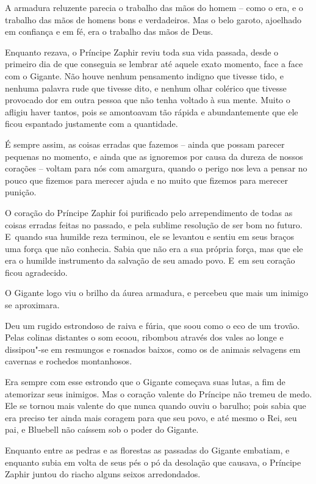 A armadura reluzente parecia o trabalho das mãos do homem -- como o era,
e o trabalho das mãos de homens bons e verdadeiros. Mas o belo garoto,
ajoelhado em confiança e em fé, era o trabalho das mãos de Deus.

Enquanto rezava, o Príncipe Zaphir reviu toda sua vida passada, desde o
primeiro dia de que conseguia se lembrar até aquele exato momento, face
a face com o Gigante. Não houve nenhum pensamento indigno que tivesse
tido, e nenhuma palavra rude que tivesse dito, e nenhum olhar colérico
que tivesse provocado dor em outra pessoa que não tenha voltado à sua
mente. Muito o afligiu haver tantos, pois se amontoavam tão rápida e
abundantemente que ele ficou espantado justamente com a quantidade.

É sempre assim, as coisas erradas que fazemos -- ainda que possam
parecer pequenas no momento, e ainda que as ignoremos por causa da
dureza de nossos corações -- voltam para nós com amargura, quando o
perigo nos leva a pensar no pouco que fizemos para merecer ajuda e no
muito que fizemos para merecer punição.

O coração do Príncipe Zaphir foi purificado pelo arrependimento de todas
as coisas erradas feitas no passado, e pela sublime resolução de ser bom
no futuro. E~quando sua humilde reza terminou, ele se levantou e sentiu
em seus braços uma força que não conhecia. Sabia que não era a sua
própria força, mas que ele era o humilde instrumento da salvação de seu
amado povo. E~em seu coração ficou agradecido.

O Gigante logo viu o brilho da áurea armadura, e percebeu que mais um
inimigo se aproximara.

Deu um rugido estrondoso de raiva e fúria, que soou como o eco de um
trovão. Pelas colinas distantes o som ecoou, ribombou através dos vales
ao longe e dissipou"-se em resmungos e rosnados baixos, como os de
animais selvagens em cavernas e rochedos montanhosos.

Era sempre com esse estrondo que o Gigante começava suas lutas, a fim de
atemorizar seus inimigos. Mas o coração valente do Príncipe não tremeu
de medo. Ele se tornou mais valente do que nunca quando ouviu o barulho;
pois sabia que era preciso ter ainda mais coragem para que seu povo, e
até mesmo o Rei, seu pai, e Bluebell não caíssem sob o poder do Gigante.

Enquanto entre as pedras e as florestas as passadas do Gigante embatiam,
e enquanto subia em volta de seus pés o pó da desolação que causava, o
Príncipe Zaphir juntou do riacho alguns seixos arredondados.

